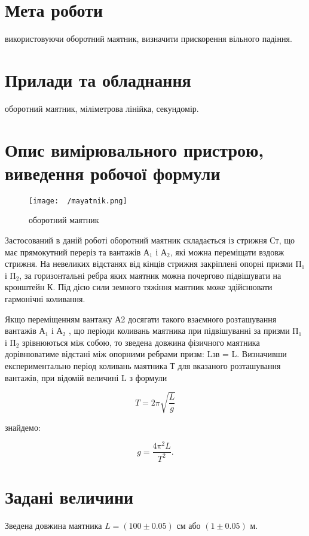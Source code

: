\documentclass{article}
\begin{document}

{\fontsize{14}{16.2}\selectfont

\section*{Мета роботи}
використовуючи оборотний маятник, визначити прискорення
вільного падіння.

\section*{Прилади та обладнання}
оборотний маятник, міліметрова лінійка, секундомір.

\section*{Опис вимірювального пристрою, виведення
робочої формули}

\begin{figure}[h]
	\centering
	\texttt{[image: ~/mayatnik.png]}
	\caption{оборотний маятник}
\end{figure}

     Застосований в даній роботі оборотний маятник складається із
стрижня  Ст, що має прямокутний переріз та вантажів  А$_1$ і  А$_2$, які
можна  переміщати  вздовж  стрижня.  На  невеликих  відстанях  від
кінців стрижня закріплені опорні призми П$_1$ і П$_2$, за  горизонтальні
ребра яких маятник можна почергово підвішувати на кронштейн К.
Під  дією  сили  земного  тяжіння  маятник  може  здійснювати
гармонічні коливання.

\medskip

       Якщо переміщенням вантажу  А2 досягати такого взаємного
розташування вантажів А$_1$ і А$_2$ , що періоди коливань маятника при
підвішуванні за призми  П$_1$ і П$_2$  зрівнюються між собою, то зведена
  довжина фізичного маятника дорівнюватиме відстані між
опорними ребрами призм: Lзв = L.  Визначивши експериментально
період коливань маятника Т для вказаного розташування  вантажів,
при відомій величині L з формули

$$T=2\pi\sqrt{\frac{L}{g}}$$

              знайдемо:

$$g=\frac{4\pi^2L}{T^2}.$$

\section*{Задані величини}
Зведена довжина маятника $L=(100\pm0.05)$ см або $(1\pm0.05)$ м.

}
\end{document}
